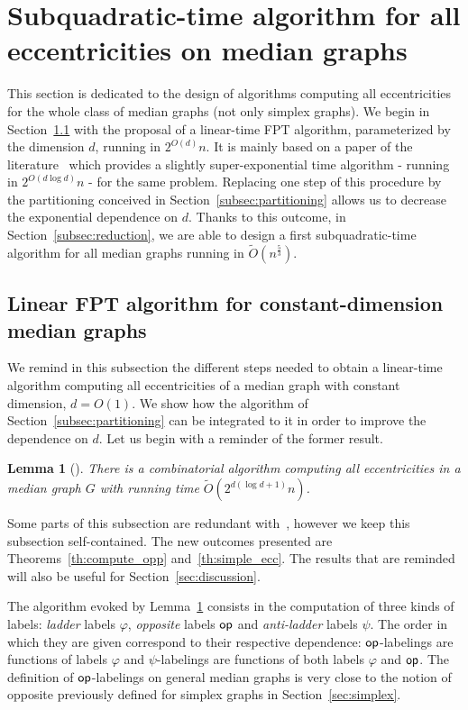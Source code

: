 \documentclass{article}
\newtheorem{lemma}{Lemma}
\newcommand{\opp}{\mbox{\textsf{op}}}
\begin{document}
\section{Subquadratic-time algorithm for all eccentricities on median graphs} \label{sec:subquadratic}

This section is dedicated to the design of algorithms computing all eccentricities for the whole class of  median graphs (not only simplex graphs). We begin in Section~\ref{subsec:constant_dim} with the proposal of a linear-time FPT algorithm, parameterized by the dimension $d$, running in $2^{O(d)}n$. It is mainly based on a paper of the literature~\cite{BeHa21} which provides a slightly super-exponential time algorithm - running in $2^{O(d\log d)}n$ - for the same problem. Replacing one step of this procedure by the partitioning conceived in Section~\ref{subsec:partitioning} allows us to decrease the exponential dependence on $d$. Thanks to this outcome, in Section~\ref{subsec:reduction}, we are able to design a first subquadratic-time algorithm for all median graphs running in $\tilde{O}(n^{\frac{5}{3}})$.

\subsection{Linear FPT algorithm for constant-dimension median graphs} \label{subsec:constant_dim}

We remind in this subsection the different steps needed to obtain a linear-time algorithm computing all eccentricities of a median graph with constant dimension, $d=O(1)$. We show how the algorithm of Section~\ref{subsec:partitioning} can be integrated to it in order to improve the dependence on $d$. Let us begin with a reminder of the former result.

\begin{lemma}[\cite{BeHa21}]
There is a combinatorial algorithm computing all eccentricities in a median graph $G$ with running time $\tilde{O}(2^{d(\log d + 1)}n)$.
\label{le:slightly_super_exp}
\end{lemma}

Some parts of this subsection are redundant with~\cite{BeHa21}, however we keep this subsection self-contained. The new outcomes presented are Theorems~\ref{th:compute_opp} and~\ref{th:simple_ecc}. The results that are reminded will also be useful for Section~\ref{sec:discussion}.

The algorithm evoked by Lemma~\ref{le:slightly_super_exp} consists in the computation of three kinds of labels: \textit{ladder} labels $\varphi$, \textit{opposite} labels $\opp$ and \textit{anti-ladder} labels $\psi$. The order in which they are given correspond to their respective dependence: $\opp$-labelings are functions of labels $\varphi$ and $\psi$-labelings are functions of both labels $\varphi$ and $\opp$.
The definition of $\opp$-labelings on general median graphs is very close to the notion of opposite previously defined for simplex graphs in Section~\ref{sec:simplex}.
\end{document}
